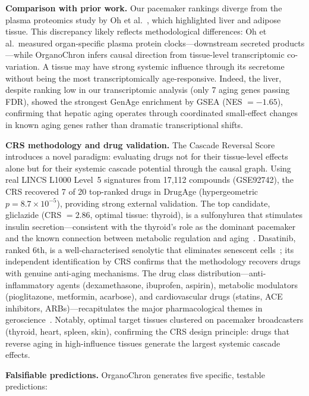 \documentclass[11pt,a4paper]{article}
\begin{document}
\textbf{Comparison with prior work.} Our pacemaker rankings diverge from the plasma proteomics study by Oh et al.~\cite{ref12}, which highlighted liver and adipose tissue. This discrepancy likely reflects methodological differences: Oh et al.\ measured organ-specific plasma protein clocks---downstream secreted products---while OrganoChron infers causal direction from tissue-level transcriptomic co-variation. A tissue may have strong systemic influence through its secretome without being the most transcriptomically age-responsive. Indeed, the liver, despite ranking low in our transcriptomic analysis (only 7 aging genes passing FDR), showed the strongest GenAge enrichment by GSEA (NES $= -1.65$), confirming that hepatic aging operates through coordinated small-effect changes in known aging genes rather than dramatic transcriptional shifts.

\textbf{CRS methodology and drug validation.} The Cascade Reversal Score introduces a novel paradigm: evaluating drugs not for their tissue-level effects alone but for their systemic cascade potential through the causal graph. Using real LINCS L1000 Level~5 signatures from 17,112 compounds (GSE92742), the CRS recovered 7 of 20 top-ranked drugs in DrugAge (hypergeometric $p = 8.7 \times 10^{-5}$), providing strong external validation. The top candidate, gliclazide (CRS $= 2.86$, optimal tissue: thyroid), is a sulfonylurea that stimulates insulin secretion---consistent with the thyroid's role as the dominant pacemaker and the known connection between metabolic regulation and aging~\cite{ref16}. Dasatinib, ranked 6th, is a well-characterised senolytic that eliminates senescent cells~\cite{ref18,ref51}; its independent identification by CRS confirms that the methodology recovers drugs with genuine anti-aging mechanisms. The drug class distribution---anti-inflammatory agents (dexamethasone, ibuprofen, aspirin), metabolic modulators (pioglitazone, metformin, acarbose), and cardiovascular drugs (statins, ACE inhibitors, ARBs)---recapitulates the major pharmacological themes in geroscience~\cite{ref4,ref16}. Notably, optimal target tissues clustered on pacemaker broadcasters (thyroid, heart, spleen, skin), confirming the CRS design principle: drugs that reverse aging in high-influence tissues generate the largest systemic cascade effects.

\textbf{Falsifiable predictions.} OrganoChron generates five specific, testable predictions:
\end{document}
